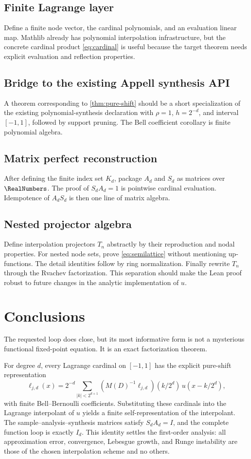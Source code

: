 \documentclass[11pt,oneside]{article}
\numberwithin{equation}{section}
\theoremstyle{definition}
\theoremstyle{remark}
\begin{document}
\subsection{Finite Lagrange layer}
Define a finite node vector, the cardinal polynomials, and an evaluation linear map.
Mathlib already has polynomial interpolation infrastructure, but the concrete
cardinal product \eqref{eq:cardinal} is useful because the target theorem needs
explicit evaluation and reflection properties.

\subsection{Bridge to the existing Appell synthesis API}
A theorem corresponding to \cref{thm:pure-shift} should be a short specialization
of the existing polynomial-synthesis declaration with
\(\rho=1\), \(h=2^{-d}\), and interval \([-1,1]\), followed by support pruning.
The Bell coefficient corollary is finite polynomial algebra.

\subsection{Matrix perfect reconstruction}
After defining the finite index set \(K_d\), package \(A_d\) and \(S_d\) as
matrices over \(\RealNumbers\).  The proof of \(S_dA_d=1\) is pointwise cardinal evaluation.
Idempotence of \(A_dS_d\) is then one line of matrix algebra.

\subsection{Nested projector algebra}
Define interpolation projectors \(T_n\) abstractly by their reproduction and nodal
properties.  For nested node sets, prove \eqref{eq:semilattice} without mentioning
up-functions.  The detail identities follow by ring normalization.  Finally rewrite
\(T_n\) through the Rvachev factorization.  This separation should make the Lean
proof robust to future changes in the analytic implementation of \(u\).

\section{Conclusions}
The requested loop does close, but its most informative form is not a mysterious
functional fixed-point equation.  It is an exact factorization theorem.

For degree \(d\), every Lagrange cardinal on \([-1,1]\) has the explicit
pure-shift representation
\[
 \ell_{j,d}(x)=2^{-d}\sum_{|k|<2^{d+1}}
 (M(D)^{-1}\ell_{j,d})(k/2^d)\,u(x-k/2^d),
\]
with finite Bell--Bernoulli coefficients.  Substituting these cardinals into the
Lagrange interpolant of \(u\) yields a finite self-representation of the interpolant.
The sample--analysis--synthesis matrices satisfy \(S_dA_d=I\), and the complete
function loop is exactly \(I_d\).  This identity settles the first-order analysis:
all approximation error, convergence, Lebesgue growth, and Runge instability are
those of the chosen interpolation scheme and no others.
\end{document}
